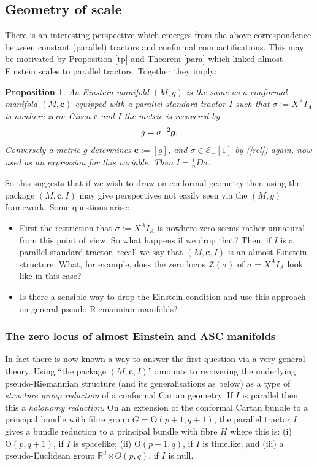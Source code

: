 \documentclass[a4paper,12pt]{amsart}
\newcommand{\cZ}{\mathcal{Z}}
\def\Cal{\mathcal}
\newcommand{\cc}{\boldsymbol{c}}
\newcommand{\ce}{{\Cal E}}
\def\bg{\mbox{\boldmath $g$}}
\newcommand{\si}{\sigma}
\newtheorem{proposition}[theorem]{Proposition}
\theoremstyle{remark}
\newcommand{\nn}[1]{(\ref{#1})}
\begin{document}
\subsection{Geometry of scale}\label{scale}

There is an interesting perspective which emerges from the above correspondence between constant (parallel) tractors and conformal compactifications. This may be motivated by Proposition \ref{tp} and Theorem \ref{para} which linked almost Einstein scales to parallel tractors. Together they imply:
\begin{proposition}
An Einstein manifold $(M,g)$ is the same as a conformal manifold
$(M,\cc)$ equipped with a parallel standard tractor $I$ such that
$\si:=X^AI_A$ is nowhere zero: Given $\cc$ and $I$ the metric is recovered by 
\begin{equation}\label{rel}
g=\si^{-2}\bg.
\end{equation}
Conversely a metric $g$ determines $\cc:=[g]$, and $\si\in \ce_+[1]$
by \nn{rel} again, now used as an expression for this variable. Then
$I=\frac{1}{n}D\si$.
\end{proposition} 


So this suggests that if we wish to draw on conformal geometry then
using the package $(M,\cc,I)$ may give perspectives not easily seen
via the $(M,g)$ framework. Some questions arise:
\begin{itemize}[noitemsep, topsep=0pt]
\item[(1)] First the restriction that $\si:=X^AI_A$ is nowhere zero
  seems rather unnatural from this point of view. So what happens if
  we drop that? Then, if $I$ is a parallel standard tractor, recall we
  say that $(M,\cc,I)$ is an almost Einstein structure. What, for
  example, does the zero locus $\cZ(\si)$ of $\si=X^AI_A$ look like in
  this case?
\item[(2)] Is there a sensible way to drop the Einstein condition and use this approach on general pseudo-Riemannian manifolds?
\end{itemize}


\subsubsection{The zero locus of almost Einstein and ASC manifolds} \label{HolonomyRed}
In fact there is now known a way to answer the first question via a
very general theory.  Using ``the package $(M,\cc,I)$'' amounts to
recovering the underlying pseudo-Riemannian structure (and its
generalisations as below) as a type of {\em structure group reduction}
of a conformal Cartan geometry. If $I$ is parallel then this a {\em
  holonomy reduction}.  On an extension of the conformal Cartan bundle
to a principal bundle with fibre group $G=\mathrm{O}(p+1,q+1)$, the
parallel tractor $I$ gives a bundle reduction to a principal bundle
with fibre $H$ where this is: (i) $\mathrm{O}(p,q+1)$, if $I$ is
spacelike; (ii) $\mathrm{O}(p+1,q)$, if $I$ is timelike; and (iii) a
pseudo-Euclidean group $\mathbb{R}^d \rtimes O(p,q)$, if $I$ is null.
\end{document}
